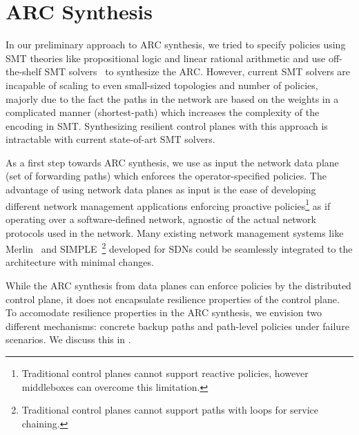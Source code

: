 \section{ARC Synthesis}

In our preliminary approach to ARC synthesis, 
we tried to specify policies using SMT theories like propositional logic and 
linear rational arithmetic and 
use off-the-shelf SMT solvers~\cite{z3} 
to synthesize the ARC. However, current SMT solvers are incapable of 
scaling to even small-sized topologies and number of policies, majorly
due to the fact the paths in the network are based on the weights in a 
complicated manner (shortest-path) which increases the complexity of the
encoding in SMT. Synthesizing resilient control planes with this 
approach is intractable with current state-of-art SMT solvers.

As a first step towards ARC synthesis, 
we use as input the network data plane 
(set of forwarding paths) which 
enforces the operator-specified policies. The  
advantage of using network data planes as 
input is the ease of developing
different network management applications 
enforcing proactive policies\footnote{
Traditional control planes cannot support reactive policies, however
middleboxes can overcome this limitation.} 
as if operating over a software-defined
network, agnostic of the actual network protocols used in the network. 
Many existing network management systems like Merlin~\cite{merlin} 
and SIMPLE~\cite{simple}\footnote{
Traditional control planes cannot support 
paths with loops for service chaining.} developed for SDNs could be seamlessly
integrated to the architecture with minimal changes.  

While the ARC synthesis from data planes can enforce 
policies by the distributed control plane, it does not
encapsulate resilience properties of the control plane. 
To accomodate resilience properties in the ARC synthesis,
we envision two different mechanisms: concrete
backup paths and path-level policies under failure scenarios. 
We discuss this in . 

